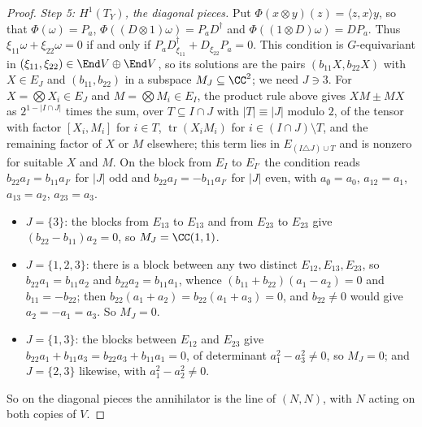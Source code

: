\begin{proof}
\emph{Step 5: $H^{1}(T_{Y})$, the diagonal pieces.} Put
$\Phi(x\otimes y)(z)=\langle z,x\rangle y$, so that $\Phi(\omega)=P_{a}$,
$\Phi((D\otimes1)\omega)=P_{a}D^{\dagger}$ and $\Phi((1\otimes D)\omega)=
DP_{a}$. Thus $\xi_{11}\omega+\xi_{22}\omega=0$ if and only if
$P_{a}D_{\xi_{11}}^{\dagger}+D_{\xi_{22}}P_{a}=0$. This condition is
$G$-equivariant in $(\xi_{11},\xi_{22})\in\End V\oplus\End V$, so its solutions
are the pairs $(b_{11}X,b_{22}X)$ with $X\in E_{J}$ and $(b_{11},b_{22})$ in a
subspace $M_{J}\subseteq\CC^{2}$; we need $J\ni3$. For $X=\bigotimes X_{i}\in
E_{J}$ and $M=\bigotimes M_{i}\in E_{I}$, the product rule above gives
$XM\pm MX$ as $2^{1-|I\cap J|}$ times the sum, over $T\subseteq I\cap J$ with
$|T|\equiv|J|$ modulo $2$, of the tensor with factor $[X_{i},M_{i}]$ for
$i\in T$, $\operatorname{tr}(X_{i}M_{i})$ for $i\in(I\cap J)\setminus T$, and
the remaining factor of $X$ or $M$ elsewhere; this term lies in
$E_{(I\triangle J)\cup T}$ and is nonzero for suitable $X$ and $M$. On the
block from $E_{I}$ to $E_{I'}$ the condition reads $b_{22}a_{I}=b_{11}a_{I'}$
for $|J|$ odd and $b_{22}a_{I}=-b_{11}a_{I'}$ for $|J|$ even, with
$a_{\emptyset}=a_{0}$, $a_{12}=a_{1}$, $a_{13}=a_{2}$, $a_{23}=a_{3}$.
\begin{itemize}[leftmargin=1.6em,itemsep=1pt]
\item $J=\{3\}$: the blocks from $E_{13}$ to $E_{13}$ and from $E_{23}$ to
  $E_{23}$ give $(b_{22}-b_{11})a_{2}=0$, so $M_{J}=\CC(1,1)$.
\item $J=\{1,2,3\}$: there is a block between any two distinct
  $E_{12},E_{13},E_{23}$, so $b_{22}a_{1}=b_{11}a_{2}$ and
  $b_{22}a_{2}=b_{11}a_{1}$, whence $(b_{11}+b_{22})(a_{1}-a_{2})=0$ and
  $b_{11}=-b_{22}$; then $b_{22}(a_{1}+a_{2})=b_{22}(a_{1}+a_{3})=0$, and
  $b_{22}\ne0$ would give $a_{2}=-a_{1}=a_{3}$. So $M_{J}=0$.
\item $J=\{1,3\}$: the blocks between $E_{12}$ and $E_{23}$ give
  $b_{22}a_{1}+b_{11}a_{3}=b_{22}a_{3}+b_{11}a_{1}=0$, of determinant
  $a_{1}^{2}-a_{3}^{2}\ne0$, so $M_{J}=0$; and $J=\{2,3\}$ likewise, with
  $a_{1}^{2}-a_{2}^{2}\ne0$.
\end{itemize}
So on the diagonal pieces the annihilator is the line of $(N,N)$, with $N$
acting on both copies of $V$.


\end{proof}
